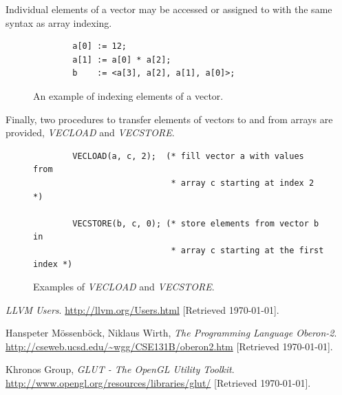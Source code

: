 \documentclass[a4paper,11pt]{article}
\begin{document}
    \noindent
    Individual elements of a vector may be accessed or assigned to with the same syntax as array indexing.

    \begin{figure}[!htbp]
    \begin{lstlisting}
        a[0] := 12;
        a[1] := a[0] * a[2];
        b    := <a[3], a[2], a[1], a[0]>;
    \end{lstlisting}
    \caption{An example of indexing elements of a vector.}
    \end{figure}

    \noindent
    Finally, two procedures to transfer elements of vectors to and from arrays are provided, \emph{VECLOAD} and \emph{VECSTORE}.

    \begin{figure}[!htbp]
    \begin{lstlisting}
        VECLOAD(a, c, 2);  (* fill vector a with values from
                            * array c starting at index 2    *)

        VECSTORE(b, c, 0); (* store elements from vector b in
                            * array c starting at the first index *)
    \end{lstlisting}
    \caption{Examples of \emph{VECLOAD} and \emph{VECSTORE}.}
    \end{figure}

    \begin{thebibliography}{9}
            \emph{LLVM Users}. \newline
            \url{http://llvm.org/Users.html}
            [Retrieved \today].

            Hanspeter M\"{o}ssenb\"{o}ck, Niklaus Wirth,
            \emph{The Programming Language Oberon-2}. \newline
            \url{http://cseweb.ucsd.edu/~wgg/CSE131B/oberon2.htm}
            [Retrieved \today].

            Khronos Group,
            \emph{GLUT - The OpenGL Utility Toolkit}. \newline
            \url{http://www.opengl.org/resources/libraries/glut/}
            [Retrieved \today].

    \end{thebibliography}
\end{document}
